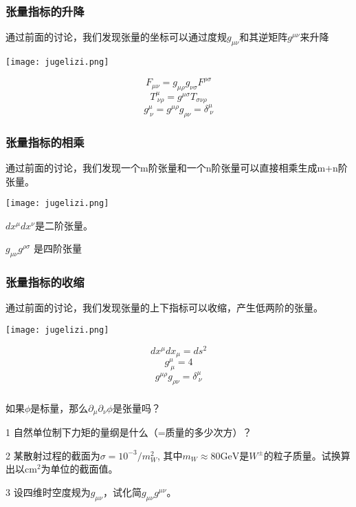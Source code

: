 \documentclass[CJK]{beamer}
\begin{document}
\begin{frame}
\frametitle{\bch 张量指标的升降\ech}
\bch
通过前面的讨论，我们发现张量的坐标可以通过度规$g_{\mu\nu}$和其逆矩阵$g^{\mu\nu}$来升降
\ech
{\vskip 0.1in}

\begin{minipage}{0.3\textwidth}
\texttt{[image: jugelizi.png]}
\end{minipage}
\begin{minipage}{0.6\textwidth}
$$F_{\mu\nu} = g_{\mu\rho}g_{\nu\sigma}F^{\rho\sigma}$$
$$T^{\mu}_{\ \nu\rho} = g^{\mu\sigma} T_{\sigma\nu\rho}$$
$$g^{\mu}_{\ \nu} = g^{\mu\rho}g_{\rho\nu} = \delta^{\mu}_{\ \nu}$$
\end{minipage}
\end{frame}


\begin{frame}
\frametitle{\bch 张量指标的相乘\ech}
\bch
通过前面的讨论，我们发现一个m阶张量和一个n阶张量可以直接相乘生成m+n阶张量。
\ech
{\vskip 0.1in}

\begin{minipage}{0.3\textwidth}
\texttt{[image: jugelizi.png]}
\end{minipage}
\begin{minipage}{0.6\textwidth}
\bch
$dx^\mu dx^\nu$是二阶张量。

$g_{\mu\nu}g^{\rho\sigma}$ 是四阶张量
\ech
\end{minipage}
\end{frame}



\begin{frame}
\frametitle{\bch 张量指标的收缩\ech}
\bch
通过前面的讨论，我们发现张量的上下指标可以收缩，产生低两阶的张量。
\ech
{\vskip 0.1in}

\begin{minipage}{0.3\textwidth}
\texttt{[image: jugelizi.png]}
\end{minipage}
\begin{minipage}{0.6\textwidth}
$$dx^\mu dx_\mu = ds^2$$
$$g^{\mu}_{\ \mu} = 4$$
$$g^{\mu\rho}g_{\rho\nu} = \delta^{\mu}_{\ \nu}$$
\end{minipage}
\end{frame}



\begin{frame}
\frametitle{\ech}
\bch
{}
如果$\phi$是标量，那么$\partial_\mu\partial_\nu\phi$是张量吗？
\ech
\end{frame}

\begin{frame}
  \bch
  \bitem
\item[1]{自然单位制下力矩的量纲是什么（=质量的多少次方）？}
\item[2]{某散射过程的截面为$\sigma = 10^{-3}/m_W^2$, 其中$m_W \approx 80 \mathrm{GeV}$是$W^{\pm}$的粒子质量。试换算出以$\mathrm{cm}^2$为单位的截面值。}
\item[3]{设四维时空度规为$g_{\mu\nu}$，试化简$g_{\mu\nu}g^{\mu\nu}$。}
  \eitem
  \ech
\end{frame}
\end{document}
